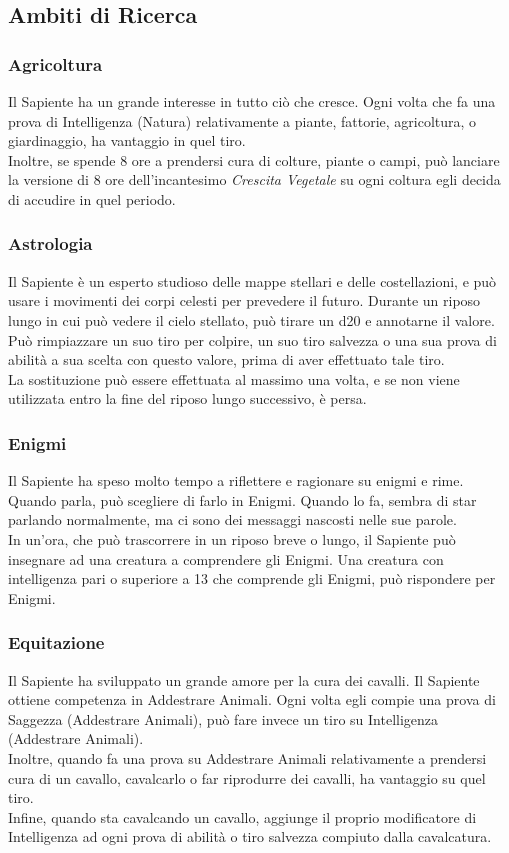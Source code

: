 \subsection{Ambiti di Ricerca}

\subsubsection{Agricoltura}
Il Sapiente ha un grande interesse in tutto ciò che cresce. Ogni volta che fa una prova di Intelligenza (Natura) relativamente a piante, fattorie, agricoltura, o giardinaggio, ha vantaggio in quel tiro. \\
Inoltre, se spende 8 ore a prendersi cura di colture, piante o campi, può lanciare la versione di 8 ore dell'incantesimo \textit{Crescita Vegetale} su ogni coltura egli decida di accudire in quel periodo.

\subsubsection{Astrologia}
Il Sapiente è un esperto studioso delle mappe stellari e delle costellazioni, e può usare i movimenti dei corpi celesti per prevedere il futuro. Durante un riposo lungo in cui può vedere il cielo stellato, può tirare un d20 e annotarne il valore. Può rimpiazzare un suo tiro per colpire, un suo tiro salvezza o una sua prova di abilità a sua scelta con questo valore, prima di aver effettuato tale tiro.\\
La sostituzione può essere effettuata al massimo una volta, e se non viene utilizzata entro la fine del riposo lungo successivo, è persa.

\subsubsection{Enigmi}
Il Sapiente ha speso molto tempo a riflettere e ragionare su enigmi e rime. Quando parla, può scegliere di farlo in Enigmi. Quando lo fa, sembra di star parlando normalmente, ma ci sono dei messaggi nascosti nelle sue parole. \\
In un'ora, che può trascorrere in un riposo breve o lungo, il Sapiente può insegnare ad una creatura a comprendere gli Enigmi. Una creatura con intelligenza pari o superiore a 13 che comprende gli Enigmi, può rispondere per Enigmi.

\subsubsection{Equitazione}
Il Sapiente ha sviluppato un grande amore per la cura dei cavalli. Il Sapiente ottiene competenza in Addestrare Animali. Ogni volta egli compie una prova di Saggezza (Addestrare Animali), può fare invece un tiro su Intelligenza (Addestrare Animali).\\
Inoltre, quando fa una prova su Addestrare Animali relativamente a prendersi cura di un cavallo, cavalcarlo o far riprodurre dei cavalli, ha vantaggio su quel tiro.\\
Infine, quando sta cavalcando un cavallo, aggiunge il proprio modificatore di Intelligenza ad ogni prova di abilità o tiro salvezza compiuto dalla cavalcatura.

